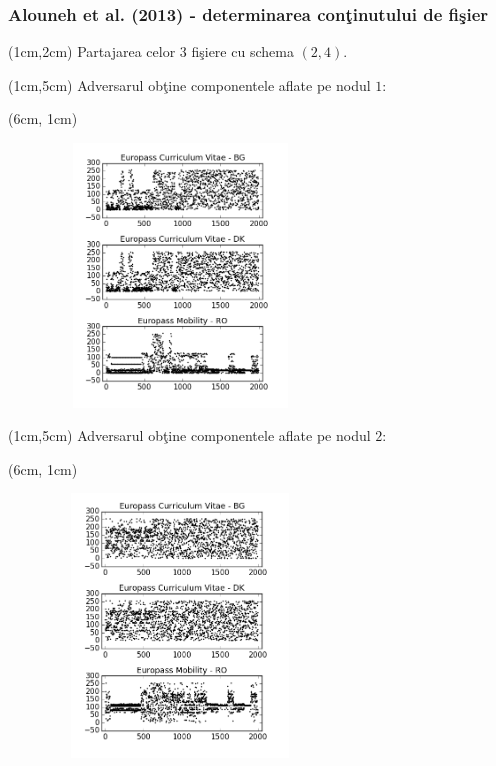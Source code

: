 \documentclass{beamer}
\theoremstyle{definition}
\begin{document}
\begin{frame}
    \frametitle{Alouneh et al. (2013) - determinarea con\c{t}inutului de fi\c{s}ier}
    \begin{textblock*}{4cm}(1cm,2cm)
        Partajarea celor 3 fi\c{s}iere cu schema $(2,4)$. 
    \end{textblock*}

     { 
        \begin{textblock*}{4cm}(1cm,5cm)
            Adversarul ob\c{t}ine componentele aflate pe nodul $1$:
        \end{textblock*}
       \begin{textblock*}{4cm}(6cm, 1cm)
            \begin{figure}
                \includegraphics[width=7cm,height=7cm,keepaspectratio]{img/results/db1.png}
           \end{figure}
        \end{textblock*} 
    }
     {
    \begin{textblock*}{4cm}(1cm,5cm)
            Adversarul ob\c{t}ine componentele aflate pe nodul $2$:
        \end{textblock*}
       \begin{textblock*}{4cm}(6cm, 1cm)
            \begin{figure}
                \includegraphics[width=7cm,height=7cm,keepaspectratio]{img/results/db2.png}
           \end{figure}
        \end{textblock*} 
    }
\end{frame}
\end{document}
